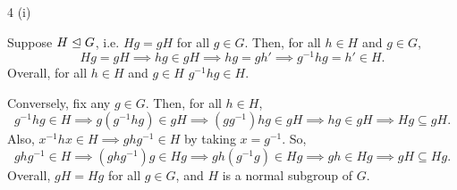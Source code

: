 \documentclass[11pt]{penrose}
\begin{document}
\begin{problem}{4 (i)}

    Suppose $H \mathrel{\trianglelefteq} G$, i.e. $Hg = gH$ for all $g \in G$. Then, for all $h \in H$ and $g \in G$,
    \begin{equation*}
         Hg = gH \implies hg \in gH \implies hg = gh' \implies g^{-1}hg = h' \in H.
    \end{equation*}
    Overall, for all $h \in H$ and $g \in H$ $g^{-1}hg \in H$.

    Conversely, fix any $g \in G$. Then, for all $h \in H$,
    \begin{equation*}
        g^{-1}hg \in H
        \implies g(g^{-1}hg) \in gH
        \implies (gg^{-1})hg \in gH
        \implies hg \in gH
        \implies Hg \subseteq gH.
    \end{equation*}
    Also, $x^{-1}hx \in H \implies ghg^{-1} \in H$ by taking $x = g^{-1}$. So,
    \begin{equation*}
        ghg^{-1} \in H
        \implies (ghg^{-1})g \in Hg
        \implies gh(g^{-1}g) \in Hg
        \implies gh \in Hg
        \implies gH \subseteq Hg.
    \end{equation*}
    Overall, $gH = Hg$ for all $g \in G$, and $H$ is a normal subgroup of $G$.
\end{problem}
\end{document}
